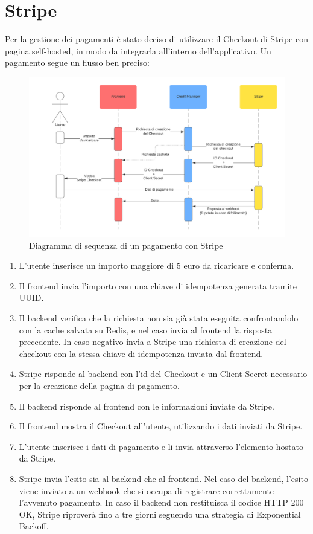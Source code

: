 \section{Stripe}
Per la gestione dei pagamenti \`e stato deciso di utilizzare il Checkout di Stripe con pagina self-hosted, in modo da integrarla all'interno dell'applicativo. Un pagamento segue un flusso ben preciso:
\begin{figure}[H]
  \centering
  \hspace*{-0.55in}\includegraphics[width=16cm]{images/stripe-pagamento-diagramma.png}
  \caption{Diagramma di sequenza di un pagamento con Stripe}
  \label{stripepayment}
\end{figure}
\newpage
\begin{enumerate}
  \item L'utente inserisce un importo maggiore di 5 euro da ricaricare e conferma.
  \item Il frontend invia l'importo con una chiave di idempotenza generata tramite UUID.
  \item Il backend verifica che la richiesta non sia gi\`a stata eseguita confrontandolo con la cache salvata su Redis, e nel caso invia al frontend la risposta precedente. In caso negativo invia a Stripe una richiesta di
    creazione del checkout con la stessa chiave di idempotenza inviata dal frontend.
  \item Stripe risponde al backend con l'id del Checkout e un Client Secret necessario per la creazione della pagina di pagamento.
  \item Il backend risponde al frontend con le informazioni inviate da Stripe.
  \item Il frontend mostra il Checkout all'utente, utilizzando i dati inviati da Stripe.
  \item L'utente inserisce i dati di pagamento e li invia attraverso l'elemento hostato da Stripe.
  \item Stripe invia l'esito sia al backend che al frontend. Nel caso del backend, l'esito viene inviato a un webhook che si occupa di registrare correttamente l'avvenuto
    pagamento. In caso il backend non restituisca il codice HTTP 200 OK, Stripe riprover\`a fino a tre giorni seguendo una strategia di Exponential Backoff.
\end{enumerate}

